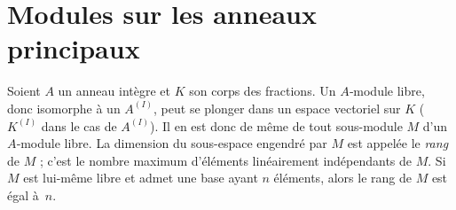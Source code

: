 \documentclass[11pt, %
  title in boldface,
  theorem in new line,
  theorem numbering = section,
  number theorems separately,
  simple name,
]{beaulivre}
\begin{document}
\section{Modules sur les anneaux principaux}

    Soient \( A \) un anneau intègre et \( K \) son corps des fractions. Un \( A \)‑module libre, donc isomorphe à un \( A^{(I)} \), peut se plonger dans un espace vectoriel sur \( K \) (\( K^{(I)} \) dans le cas de \( A^{(I)} \)). Il en est donc de même de tout sous-module \( M \) d'un \( A \)‑module libre. La dimension du sous-espace engendré par \( M \) est appelée le \emph{rang} de \( M \) ; c'est le nombre maximum d'éléments linéairement indépendants de \( M \). Si \( M \) est lui-même libre et admet une base ayant \( n \) éléments, alors le rang de \( M \) est égal à~\( n \).
\end{document}
